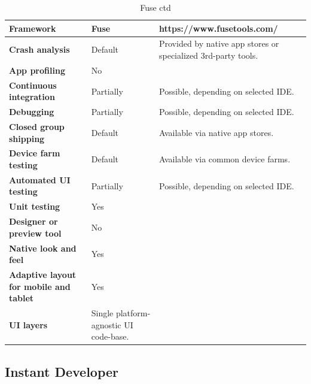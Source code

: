 \documentclass[english,master,public,dept460,male,cpdeclaration,oneside]{diploma}
\begin{document}
\begin{table}[!h]
	\centering
	\caption{Fuse ctd}
	\begin{tabular}{p{} | p{} | p{}}
		\toprule		
		\textbf{Framework} & \textbf{Fuse} & https://www.fusetools.com/ \\
		\midrule
		\textbf{Crash analysis} & Default & Provided by native app stores or specialized 3rd-party tools. \\			
		\midrule
		\textbf{App profiling} & No & \\			
		\midrule
		\textbf{Continuous integration} & Partially & Possible, depending on selected IDE. \\			
		\midrule
		\textbf{Debugging} & Partially & Possible, depending on selected IDE. \\			
		\midrule
		\textbf{Closed group shipping} & Default & Available via native app stores. \\			
		\midrule
		\textbf{Device farm testing} & Default & Available via common device farms. \\			
		\midrule
		\textbf{Automated UI testing} & Partially & Possible, depending on selected IDE. \\			
		\midrule
		\textbf{Unit testing} & Yes & \\			
		\midrule
		\textbf{Designer or preview tool} & No & \\			
		\midrule
		\textbf{Native look and feel} & Yes & \\			
		\midrule
		\textbf{Adaptive layout for mobile and tablet} & Yes & \\			
		\midrule		
		\textbf{UI layers} & Single platform-agnostic UI code-base. &  \\			
		\midrule
	\end{tabular}
\end{table}

\clearpage
\subsection{Instant Developer}
\end{document}
